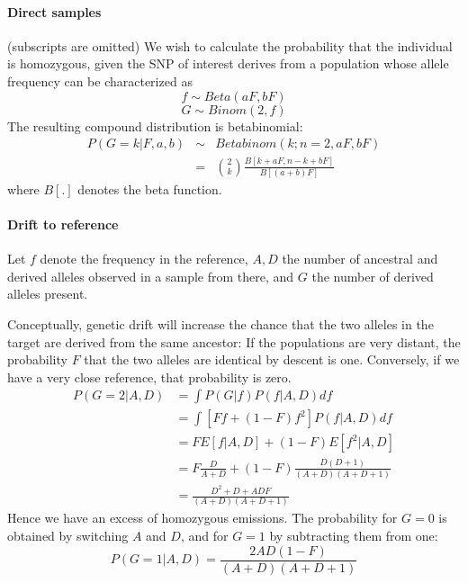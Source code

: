 \documentclass[10pt,a4paper]{article}
\begin{document}
\paragraph{Direct samples}
(subscripts are omitted) We wish to calculate the probability that the individual is homozygous, given the SNP of interest derives from a population whose allele frequency can be characterized as
$$f \sim Beta(aF, bF)$$
$$G \sim Binom(2, f)$$
The resulting compound distribution is  betabinomial:
\begin{eqnarray}
P(G=k | F, a, b) &\sim& Betabinom(k; n=2, aF, bF)\nonumber\\
&=& \binom{2}{k} \frac{B[k+a F, n-k + b F]}{B[ (a + b) F]} \label{eq:ll:homo}
\end{eqnarray}
where $B[.]$ denotes the beta function.
\paragraph{Drift to reference}
Let $f$ denote the frequency in the reference, $A, D$ the number of ancestral and derived alleles observed in a 
sample from there, and $G$ the number of derived alleles present.

Conceptually, genetic drift will increase the chance that the two alleles in the target are derived from the same ancestor: If the populations are very distant, the probability $F$ that the two alleles are identical by descent is one.  Conversely, if we have a very close reference, that probability is zero. 
\begin{align}
P(G=2 | A,D) &= \int P(G|f) P(f | A, D) df\nonumber\\
&= \int \left[ F f + (1-F) f^2\right] P(f | A, D) df\nonumber\\
&= F E[f|A, D] + (1-F)  E[f^2|A, D]\nonumber\\
&= F \frac{D}{A+D} + (1-F)  \frac{D (D+1)}{(A+D)(A+D+1)}\nonumber\\
&= \frac{D^2 + D + ADF}{(A+D)(A+D+1)}
\end{align}
Hence we have an excess of homozygous emissions. The probability for $G=0$ is obtained by switching $A$ and $D$, and for $G=1$ by subtracting them from one:
\begin{equation}
P(G=1 | A,D) = \frac{2AD(1-F)}{(A+D)(A+D+1)}
\end{equation} 
\end{document}
